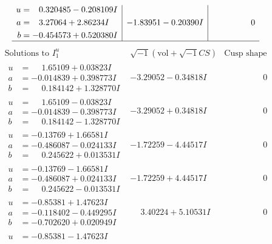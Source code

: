 \documentclass[1p]{elsarticle_modified}
\theoremstyle{definition}
\newcommand{\I}{\sqrt{-1}}
\begin{document}
$$\begin{array}{c|c|c}
\begin{aligned}
u &= \phantom{-}0.320485 - 0.208109 I \\
a &= \phantom{-}3.27064 + 2.86234 I \\
b &= -0.454573 + 0.520380 I\end{aligned}
 & -1.83951 - 0.20390 I & \phantom{-0.000000 } 0\\
 \hline 
 \end{array}$$\newpage$$\begin{array}{c|c|c}  
\text{Solutions to }I^u_{1}& \I (\text{vol} + \sqrt{-1}CS) & \text{Cusp shape}\\
 \hline 
\begin{aligned}
u &= \phantom{-}1.65109 + 0.03823 I \\
a &= -0.014839 + 0.398773 I \\
b &= \phantom{-}0.184142 + 1.328770 I\end{aligned}
 & -3.29052 - 0.34818 I & \phantom{-0.000000 } 0 \\ \hline\begin{aligned}
u &= \phantom{-}1.65109 - 0.03823 I \\
a &= -0.014839 - 0.398773 I \\
b &= \phantom{-}0.184142 - 1.328770 I\end{aligned}
 & -3.29052 + 0.34818 I & \phantom{-0.000000 } 0 \\ \hline\begin{aligned}
u &= -0.13769 + 1.66581 I \\
a &= -0.486087 - 0.024133 I \\
b &= \phantom{-}0.245622 + 0.013531 I\end{aligned}
 & -1.72259 - 4.44517 I & \phantom{-0.000000 } 0 \\ \hline\begin{aligned}
u &= -0.13769 - 1.66581 I \\
a &= -0.486087 + 0.024133 I \\
b &= \phantom{-}0.245622 - 0.013531 I\end{aligned}
 & -1.72259 + 4.44517 I & \phantom{-0.000000 } 0 \\ \hline\begin{aligned}
u &= -0.85381 + 1.47623 I \\
a &= -0.118402 - 0.449295 I \\
b &= -0.702620 + 0.020949 I\end{aligned}
 & \phantom{-}3.40224 + 5.10531 I & \phantom{-0.000000 } 0 \\ \hline\begin{aligned}
u &= -0.85381 - 1.47623 I \\

\end{aligned}
\end{array}$$
\end{document}
